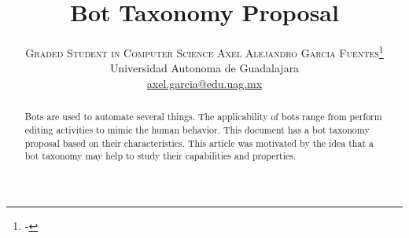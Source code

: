 \documentclass[twoside]{article}
\title{\vspace{-15mm}\fontsize{24pt}{10pt}\selectfont\textbf{Bot Taxonomy Proposal}} %
\author{
\large
\textsc{Graded Student in Computer Science Axel Alejandro Garcia Fuentes}\thanks{-}\\[2mm] %
\normalsize Universidad Autonoma de Guadalajara \\ %
\normalsize \href{mailto:axel.garcia@edu.uag.mx}{axel.garcia@edu.uag.mx} %
\vspace{-5mm}
}
\date{}
\begin{document}
\maketitle %

\thispagestyle{fancy} %


\begin{abstract}

Bots are used to automate several things. The applicability of bots range from perform editing activities to mimic the human behavior.
This document has a bot taxonomy proposal based on their characteristics. This article was motivated by the idea that a bot taxonomy 
may help to study their capabilities and properties.
\end{abstract}

\end{document}

